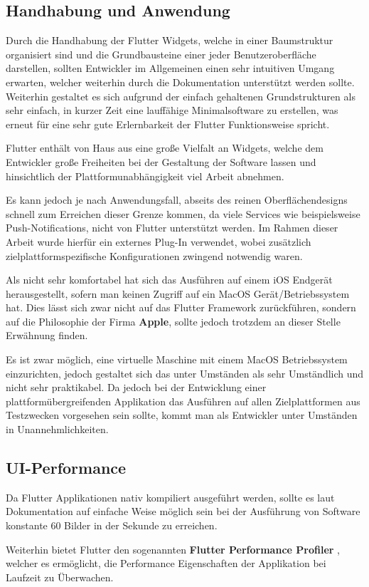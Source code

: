 \documentclass[bibliography=totoc,listof=totoc,BCOR=5mm,DIV=12,oneside]{scrbook}
\begin{document}
\subsection{Handhabung und Anwendung}
\label{sub:handhabungFLutter}
\par Durch die Handhabung der Flutter Widgets, welche in einer Baumstruktur organisiert sind und die Grundbausteine einer jeder Benutzeroberfläche darstellen, sollten Entwickler im Allgemeinen einen sehr intuitiven Umgang erwarten, welcher weiterhin durch die Dokumentation unterstützt werden sollte. Weiterhin gestaltet es sich aufgrund der einfach gehaltenen Grundstrukturen als sehr einfach, in kurzer Zeit eine lauffähige Minimalsoftware zu erstellen, was erneut für eine sehr gute Erlernbarkeit der Flutter Funktionsweise spricht.

\par \bigskip Flutter enthält von Haus aus eine große Vielfalt an Widgets, welche dem Entwickler große Freiheiten bei der Gestaltung der Software lassen und  hinsichtlich der Plattformunabhängigkeit viel Arbeit abnehmen.

\par \bigskip Es kann jedoch je nach Anwendungsfall, abseits des reinen Oberflächendesigns schnell zum Erreichen dieser Grenze kommen, da viele Services wie beispielsweise Push-Notifications, nicht von Flutter unterstützt werden. Im Rahmen dieser Arbeit wurde hierfür ein externes Plug-In verwendet, wobei zusätzlich zielplattformspezifische Konfigurationen zwingend notwendig waren.

\par \bigskip Als nicht sehr komfortabel hat sich das Ausführen auf einem iOS Endgerät herausgestellt, sofern man keinen Zugriff auf ein MacOS Gerät/Betriebssystem hat. Dies lässt sich zwar nicht auf das Flutter Framework zurückführen, sondern auf die Philosophie der Firma \textbf{Apple}\citep{AppleHomepage}, sollte jedoch trotzdem an dieser Stelle Erwähnung finden. 
\par \bigskip Es ist zwar möglich, eine virtuelle Maschine mit einem MacOS Betriebssystem einzurichten, jedoch gestaltet sich das unter Umständen als sehr Umständlich und nicht sehr praktikabel. Da jedoch bei der Entwicklung einer plattformübergreifenden Applikation das Ausführen auf allen Zielplattformen aus Testzwecken vorgesehen sein sollte, kommt man als Entwickler unter Umständen in Unannehmlichkeiten.

\subsection{UI-Performance}
\par Da Flutter Applikationen nativ kompiliert ausgeführt werden, sollte es laut Dokumentation auf einfache Weise möglich sein bei der Ausführung von Software konstante 60 Bilder in der Sekunde zu erreichen. \citep[Abschnitt \grqq What kind of App Perdormance can I expext?\grqq]{Flu3}
\par \bigskip Weiterhin bietet Flutter den sogenannten \textbf{Flutter Performance Profiler}\citep{FlutterPerformanceProfiler} , welcher es ermöglicht, die Performance Eigenschaften der Applikation bei Laufzeit zu Überwachen. 
\end{document}
